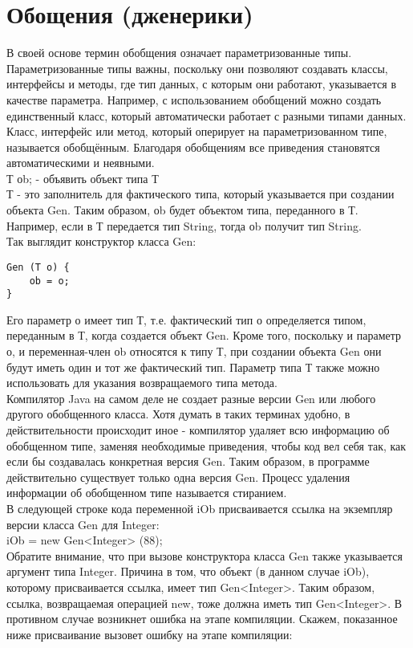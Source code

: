 \section{Обощения (дженерики)} 
В своей основе термин обобщения означает параметризованные типы. Параметризованные типы важны, поскольку они позволяют создавать классы, интерфейсы и методы, где тип данных, с которым они работают, указывается в качестве параметра. Например, с использованием обобщений можно создать единственный класс, который автоматически работает с разными типами данных. Класс, интерфейс или метод, который оперирует на параметризованном типе, называется обобщённым. Благодаря обобщениям все приведения становятся автоматическими и неявными. \\
Т оb; - объявить объект типа Т \\
Т - это заполнитель для фактического типа, который указывается при создании объекта Gen. Таким образом, оb будет объектом типа, переданного в Т. Например, если в Т передается тип String, тогда оb получит тип String. \\
Так выглядит конструктор класса Gen: \\
\begin{lstlisting}
Gen (T o) {
    ob = o;
}
\end{lstlisting}
Его параметр о имеет тип Т, т.е. фактический тип о определяется типом, переданным в Т, когда создается объект Gen. Кроме того, поскольку и параметр о, и переменная-член оb относятся к типу Т, при создании объекта Gen они будут иметь один и тот же фактический тип. Параметр типа Т также можно использовать для указания возвращаемого типа метода. \\
Компилятор Java на самом деле не создает разные версии Gen или любого другого обобщенного класса. Хотя думать в таких терминах удобно, в действительности происходит иное - компилятор удаляет всю информацию об обобщенном типе, заменяя необходимые приведения, чтобы код вел себя так, как если бы создавалась конкретная версия Gen. Таким образом, в программе действительно существует только одна версия Gen. Процесс удаления информации об обобщенном типе называется стиранием. \\
В следующей строке кода переменной iOb присваивается ссылка на экземпляр версии класса Gen для Integer: \\
iOb = new Gen<Integer> (88); \\
Обратите внимание, что при вызове конструктора класса Gen также указывается аргумент типа Integer. Причина в том, что объект (в данном случае iOb), которому присваивается ссылка, имеет тип Gen<Integer>. Таким образом, ссылка, возвращаемая операцией new, тоже должна иметь тип Gen<Integer>. В противном случае возникнет ошибка на этапе компиляции. Скажем, показанное ниже присваивание вызовет ошибку на этапе компиляции: \\
